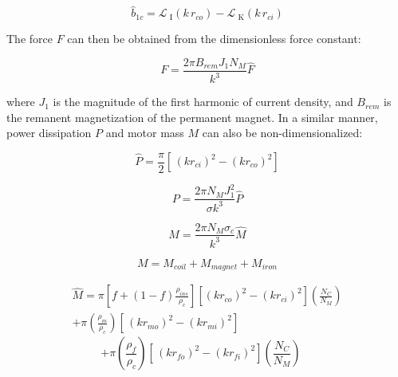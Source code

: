         
        \begin{equation}
            \hat{b}_{1c}=\mathcal{L}_{\textrm{ I}}(k\,r_{co})-\mathcal{L}_{\textrm{ K}}(k\,r_{ci})
            \label{eq:b hat 1c}
        \end{equation}
        
        
        The force $F$ can then be obtained from the dimensionless force constant:
        
        
        \begin{equation}
            F = \frac{{2\pi {B_{rem}}{J_1}{N_M}}}{{{k^3}}}\hat F
            \label{eq:actual force}
        \end{equation}
        
        
        where $J_1$ is the magnitude of the first harmonic of current density, and $B_{rem}$ is the remanent magnetization of the permanent magnet. In a similar manner, power dissipation $P$ and motor mass $M$ can also be non-dimensionalized: 
        
        
        \begin{equation}
            \hat P = \frac{\pi }{2}\left[ {\,{{\left( {k{r_{ci}}} \right)}^2} - {{\left( {k{r_{co}}} \right)}^2}} \right]
            \label{eq:P dimless}
        \end{equation}
        
        
        \begin{equation}
            P = \frac{{2\pi {N_M}J_1^2}}{{\sigma {k^3}}}\hat P
            \label{eq:power via power dimless}
        \end{equation}
        
        
        \begin{equation}
            M = \frac{{2\pi {N_M}{\sigma _c}}}{{{k^3}}}\hat M
            \label{eq:mass of motor via mass dimless}
        \end{equation}
        
        
        \begin{equation}
            M = {M_{coil}} + {M_{magnet}} + {M_{iron}}
            \label{eq:sum of all mass}
        \end{equation}
        
        
        \begin{align*}
            \hat M = \pi \left[ {f + \left( {1 - f} \right)\frac{{{\rho _{ins}}}}{{{\rho _c}}}} \right]\left[ { {{\left( {k{r_{co}}} \right)}^2} - {{\left( {k{r_{ci}}} \right)}^2}} \right]\left( {\frac{{{N_C}}}{{{N_M}}}} \right)
            \\
            +  \pi \left( {\frac{{{\rho _m}}}{{{\rho _c}}}} \right)\left[ {\,{{\left( {k{r_{mo}}} \right)}^2} - {{\left( {k{r_{mi}}} \right)}^2}} \right]\qquad\qquad\qquad\quad
            \end{align*}
            \begin{equation}
            +  \pi \left( {\frac{{{\rho _f}}}{{{\rho _c}}}} \right)\left[ {\,{{\left( {k{r_{fo}}} \right)}^2} - {{\left( {k{r_{fi}}} \right)}^2}} \right]\left( {\frac{{{N_C}}}{{{N_M}}}} \right)\quad \,
            \label{eq:sum of all mass dimless}
        \end{equation}
        
